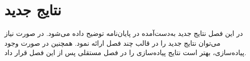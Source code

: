 
\chapter{نتایج جدید}

در این فصل نتایج جدید به‌دست‌آمده در پایان‌نامه توضیح داده می‌شود.
در صورت نیاز می‌توان نتایج جدید را در قالب چند فصل ارائه نمود.
همچنین در صورت وجود پیاده‌سازی، بهتر است نتایج پیاده‌سازی را 
در فصل مستقلی پس از این فصل قرار داد.
